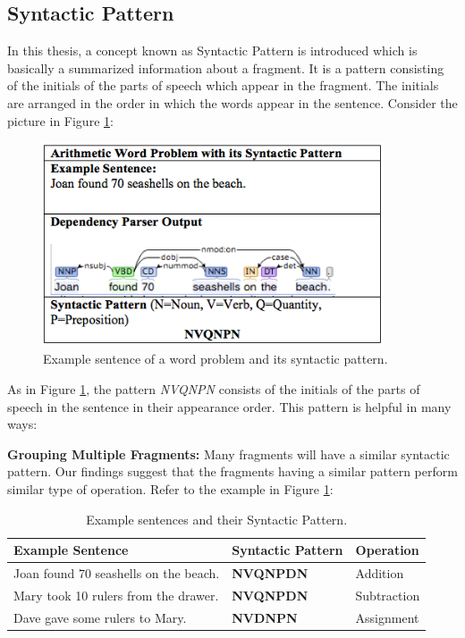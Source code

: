 \documentclass[11pt]{article}
\begin{document}
\subsection{Syntactic Pattern}\label{sec:syntacticpattern}
In this thesis, a concept known as Syntactic Pattern is introduced which is basically a summarized information about a fragment. It is a pattern consisting of the initials of the parts of speech which appear in the fragment. The initials are arranged in the order in which the words appear in the sentence. Consider the picture in Figure \ref{figure:13}:

\begin{figure}[h!]
\includegraphics[width=0.9\textwidth]{Figure1}
\centering
\caption{Example sentence of a word problem and its syntactic pattern.}
\label{figure:13}
\end{figure}

As in Figure \ref{figure:13}, the pattern \textit{NVQNPN} consists of the initials of the parts of speech in the sentence in their appearance order. This pattern is helpful in many ways:

\textbf{Grouping Multiple Fragments:} Many fragments will have a similar syntactic pattern. Our findings suggest that the fragments having a similar pattern perform similar type of operation. Refer to the example in Figure \ref{figure:14}:

\begin{table}[h!]
\centering
\begin{tabular}{ | m{16em} | m{6em} | m{6em} |}
\hline
\textbf{Example Sentence} & \textbf{Syntactic Pattern} & \textbf{Operation}\\
\hline
Joan found 70 seashells on the beach. & \textbf{NVQNPDN} & Addition \\
\hline
Mary took 10 rulers from the drawer. & \textbf{NVQNPDN} & Subtraction\\
\hline
Dave gave some rulers to Mary. & \textbf{NVDNPN} & Assignment\\
\hline
\end{tabular}
\caption{Example sentences and their Syntactic Pattern.}
\label{figure:14}
\end{table}
 
\end{document}
